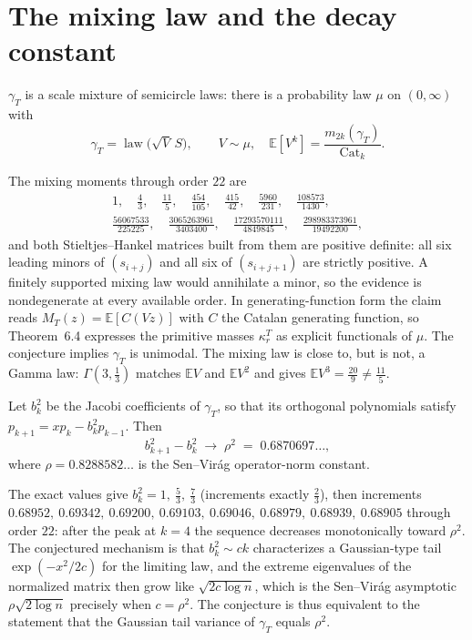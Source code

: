 \section{The mixing law and the decay constant}

\begin{conjecture}\label{conj:mix}
$\gamma_T$ is a scale mixture of semicircle laws: there is a probability
law $\mu$ on $(0,\infty)$ with
\[
\gamma_T=\operatorname{law}\bigl(\sqrt V\,S\bigr),\qquad V\sim\mu,\quad
\mathbb E[V^k]=\frac{m_{2k}(\gamma_T)}{\mathrm{Cat}_k}.
\]
\end{conjecture}

The mixing moments through order $22$ are
\begin{gather*}
1,\quad \frac43,\quad \frac{11}5,\quad \frac{454}{105},\quad
\frac{415}{42},\quad \frac{5960}{231},\quad \frac{108573}{1430},\\[2pt]
\frac{56067533}{225225},\quad \frac{3065263961}{3403400},\quad
\frac{17293570111}{4849845},\quad \frac{298983373961}{19492200},
\end{gather*}
and both Stieltjes--Hankel matrices built from them are positive definite:
all six leading minors of $(s_{i+j})$ and all six of $(s_{i+j+1})$ are
strictly positive.  A finitely supported mixing law would annihilate a
minor, so the evidence is nondegenerate at every available order.  In
generating-function form the claim reads $M_T(z)=\mathbb E[C(Vz)]$ with
$C$ the Catalan generating function, so Theorem~6.4 expresses the
primitive masses $\kappa_r^T$ as explicit functionals of $\mu$.  The
conjecture implies $\gamma_T$ is unimodal.  The mixing law is close to,
but is not, a Gamma law: $\Gamma(3,\tfrac13)$ matches $\mathbb E V$ and
$\mathbb E V^2$ and gives $\mathbb E V^3=\tfrac{20}9\ne\tfrac{11}5$.

\begin{conjecture}\label{conj:slope}
Let $b_k^2$ be the Jacobi coefficients of $\gamma_T$, so that its
orthogonal polynomials satisfy $p_{k+1}=xp_k-b_k^2p_{k-1}$.  Then
\[
b_{k+1}^2-b_k^2\;\longrightarrow\;\rho^2\;=\;0.6870697\ldots,
\]
where $\rho=0.8288582\ldots$ is the Sen--Vir\'ag operator-norm constant.
\end{conjecture}

The exact values give $b_k^2=1,\ \tfrac53,\ \tfrac73$ (increments exactly
$\tfrac23$), then increments
$0.68952,\ 0.69342,\ 0.69200,\ 0.69103,\ 0.69046,\ 0.68979,\ 0.68939,\
0.68905$ through order $22$: after the peak at $k=4$ the sequence
decreases monotonically toward $\rho^2$.  The conjectured mechanism is
that $b_k^2\sim ck$ characterizes a Gaussian-type tail
$\exp(-x^2/2c)$ for the limiting law, and the extreme eigenvalues of the
normalized matrix then grow like $\sqrt{2c\log n}$, which is the
Sen--Vir\'ag asymptotic $\rho\sqrt{2\log n}$ precisely when $c=\rho^2$.
The conjecture is thus equivalent to the statement that the Gaussian tail
variance of $\gamma_T$ equals $\rho^2$.


